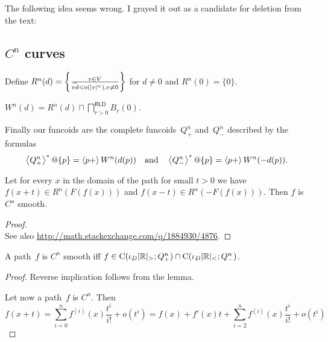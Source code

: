 The following idea seems wrong. I grayed it out as a candidate for deletion from the text:

\begin{grayed}

\subsection{$C^n$ curves}


Define $R^n(d) = \left\{ \frac{v\in V}{\widehat{vd}<o(|v|^n), v\ne 0}\right\}$ for $d\ne 0$ and $R^n(0) = \{0\}$.

\begin{defn}
$W^n(d) = R^n(d) \sqcap \bigsqcap^{\mathsf{RLD}}_{r>0}B_r(0)$.
\end{defn}

Finally our funcoids are the complete funcoids~$Q_+^n$ and~$Q_-^n$ described by the formulas
\[
\left\langle Q_+^n\right\rangle ^{\ast}@\{p\} = \left\langle p+\right\rangle W^n(d(p)) \quad\text{and}\quad \left\langle Q_-^n\right\rangle ^{\ast}@\{p\} = \left\langle p+\right\rangle W^n(-d(p)).
\]

\begin{lem}
Let for every $x$ in the domain of the path for small $t > 0$ we have $f (x + t) \in R^n (F (f (x)))$ and $f (x - t) \in R^n (- F (f (x)))$.
Then $f$ is $C^n$ smooth.
\end{lem}

\begin{proof}
\\
See also \url{http://math.stackexchange.com/q/1884930/4876}.
\end{proof}

\begin{conjecture}
A path~$f$ is $C^n$ smooth iff $f\in\mathrm{C}(\iota_D|\mathbb{R}|_{>};Q_+^n)\cap\mathrm{C}(\iota_D|\mathbb{R}|_{<};Q_-^n)$.
\end{conjecture}

\begin{proof}
Reverse implication follows from the lemma.

Let now a path~$f$ is $C^n$. Then
\[
f(x+t) = \sum_{i=0}^n f^{(i)}(x)\frac{t^i}{i!} + o(t^i) =
f(x)+f'(x)t + \sum_{i=2}^n f^{(i)}(x)\frac{t^i}{i!} + o(t^i)
\]
\end{proof}

\end{grayed}

